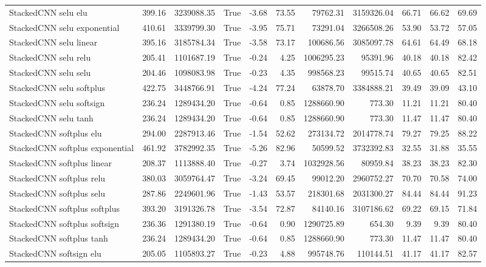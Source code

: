 \begin{tabular}{lrrlrrrrrrr}
StackedCNN selu elu & 399.16 & 3239088.35 & True & -3.68 & 73.55 & 79762.31 & 3159326.04 & 66.71 & 66.62 & 69.69 \\
StackedCNN selu exponential & 410.61 & 3339799.30 & True & -3.95 & 75.71 & 73291.04 & 3266508.26 & 53.90 & 53.72 & 57.05 \\
StackedCNN selu linear & 395.16 & 3185784.34 & True & -3.58 & 73.17 & 100686.56 & 3085097.78 & 64.61 & 64.49 & 68.18 \\
StackedCNN selu relu & 205.41 & 1101687.19 & True & -0.24 & 4.25 & 1006295.23 & 95391.96 & 40.18 & 40.18 & 82.42 \\
StackedCNN selu selu & 204.46 & 1098083.98 & True & -0.23 & 4.35 & 998568.23 & 99515.74 & 40.65 & 40.65 & 82.51 \\
StackedCNN selu softplus & 422.75 & 3448766.91 & True & -4.24 & 77.24 & 63878.70 & 3384888.21 & 39.49 & 39.09 & 43.10 \\
StackedCNN selu softsign & 236.24 & 1289434.20 & True & -0.64 & 0.85 & 1288660.90 & 773.30 & 11.21 & 11.21 & 80.40 \\
StackedCNN selu tanh & 236.24 & 1289434.20 & True & -0.64 & 0.85 & 1288660.90 & 773.30 & 11.47 & 11.47 & 80.40 \\
StackedCNN softplus elu & 294.00 & 2287913.46 & True & -1.54 & 52.62 & 273134.72 & 2014778.74 & 79.27 & 79.25 & 88.22 \\
StackedCNN softplus exponential & 461.92 & 3782992.35 & True & -5.26 & 82.96 & 50599.52 & 3732392.83 & 32.55 & 31.88 & 35.55 \\
StackedCNN softplus linear & 208.37 & 1113888.40 & True & -0.27 & 3.74 & 1032928.56 & 80959.84 & 38.23 & 38.23 & 82.30 \\
StackedCNN softplus relu & 380.03 & 3059764.47 & True & -3.24 & 69.45 & 99012.20 & 2960752.27 & 70.70 & 70.58 & 74.00 \\
StackedCNN softplus selu & 287.86 & 2249601.96 & True & -1.43 & 53.57 & 218301.68 & 2031300.27 & 84.44 & 84.44 & 91.23 \\
StackedCNN softplus softplus & 393.20 & 3191326.78 & True & -3.54 & 72.87 & 84140.16 & 3107186.62 & 69.22 & 69.15 & 71.84 \\
StackedCNN softplus softsign & 236.36 & 1291380.19 & True & -0.64 & 0.90 & 1290725.89 & 654.30 & 9.39 & 9.39 & 80.40 \\
StackedCNN softplus tanh & 236.24 & 1289434.20 & True & -0.64 & 0.85 & 1288660.90 & 773.30 & 11.47 & 11.47 & 80.40 \\
StackedCNN softsign elu & 205.05 & 1105893.27 & True & -0.23 & 4.88 & 995748.76 & 110144.51 & 41.17 & 41.17 & 82.57 \\

\end{tabular}
